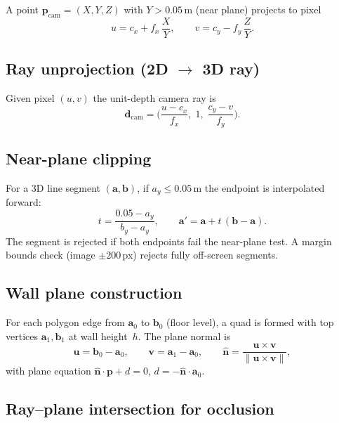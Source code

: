 \documentclass[a4paper, 11pt]{article}
\newcommand{\vect}[1]{\bm{#1}}
\begin{document}
A point $\vect{p}_{\text{cam}} = (X, Y, Z)$ with $Y > 0.05\,$m (near plane)
projects to pixel
\begin{equation}\label{eq:projection}
  u = c_x + f_x \,\frac{X}{Y},
  \qquad
  v = c_y - f_y \,\frac{Z}{Y}.
\end{equation}

\subsection{Ray unprojection (2D $\to$ 3D ray)}

Given pixel $(u, v)$ the unit-depth camera ray is
\begin{equation}\label{eq:unproject}
  \vect{d}_{\text{cam}}
  = \biggl(\frac{u - c_x}{f_x},\; 1,\; \frac{c_y - v}{f_y}\biggr).
\end{equation}

\subsection{Near-plane clipping}

For a 3D line segment $(\vect{a}, \vect{b})$, if $a_y \leq 0.05\,$m the
endpoint is interpolated forward:
\begin{equation}
  t = \frac{0.05 - a_y}{b_y - a_y},
  \qquad
  \vect{a}' = \vect{a} + t\,(\vect{b} - \vect{a}).
\end{equation}
The segment is rejected if both endpoints fail the near-plane test.
A margin bounds check (image $\pm 200\,$px) rejects fully off-screen
segments.

\subsection{Wall plane construction}

For each polygon edge from $\vect{a}_0$ to $\vect{b}_0$ (floor level), a
quad is formed with top vertices $\vect{a}_1, \vect{b}_1$ at wall
height~$h$.  The plane normal is
\begin{equation}
  \vect{u} = \vect{b}_0 - \vect{a}_0,
  \qquad
  \vect{v} = \vect{a}_1 - \vect{a}_0,
  \qquad
  \hat{\vect{n}} = \frac{\vect{u} \times \vect{v}}
                        {\|\vect{u} \times \vect{v}\|},
\end{equation}
with plane equation $\hat{\vect{n}} \cdot \vect{p} + d = 0$,
\;$d = -\hat{\vect{n}} \cdot \vect{a}_0$.

\subsection{Ray--plane intersection for occlusion}
\end{document}
